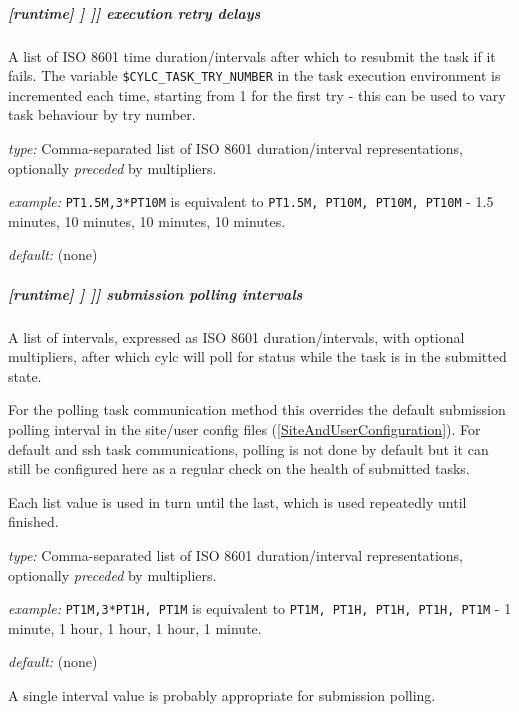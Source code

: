 \subparagraph[execution retry delays]{[runtime] \textrightarrow [[\_\_NAME\_\_]] \textrightarrow [[[job]]] \textrightarrow execution retry delays}
\label{RefRetries}

A list of ISO 8601 time duration/intervals after which to resubmit the task
if it fails. The variable \lstinline=$CYLC_TASK_TRY_NUMBER= in the task
execution environment is incremented each time, starting from 1 for the
first try - this can be used to vary task behaviour by try number.

\begin{myitemize}
    \item {\em type:} Comma-separated list of ISO 8601 duration/interval representations,
    optionally {\em preceded} by multipliers.
    \item {\em example:} \lstinline=PT1.5M,3*PT10M= is equivalent to
    \lstinline=PT1.5M, PT10M, PT10M, PT10M= - 1.5 minutes, 10 minutes,
    10 minutes, 10 minutes.
    \item {\em default:} (none)
\end{myitemize}

\subparagraph[submission polling intervals]{[runtime] \textrightarrow [[\_\_NAME\_\_]] \textrightarrow [[[job]]] \textrightarrow submission polling intervals}
\label{SubmissionPollingIntervals}

A list of intervals, expressed as ISO 8601 duration/intervals, with optional
multipliers, after which cylc will poll for status while the task is in the
submitted state.

For the polling task communication method this overrides the default
submission polling interval in the site/user config files
(\ref{SiteAndUserConfiguration}). For default and ssh task communications,
polling is not done by default but it can still be configured here as a
regular check on the health of submitted tasks.

Each list value is used in turn until the last, which is used repeatedly
until finished.

\begin{myitemize}
    \item {\em type:} Comma-separated list of ISO 8601 duration/interval
        representations, optionally {\em preceded} by multipliers.
    \item {\em example:} \lstinline=PT1M,3*PT1H, PT1M= is equivalent to
    \lstinline=PT1M, PT1H, PT1H, PT1H, PT1M= - 1 minute, 1 hour, 1 hour, 1
    hour, 1 minute.
    \item {\em default:} (none)
\end{myitemize}
A single interval value is probably appropriate for submission polling.

